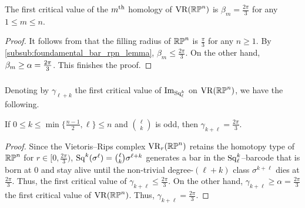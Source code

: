 \medskip\proposition
The first critical value of the $m^{\mathrm{th}}$ homology of $\operatorname{VR}(\mathbb{RP}^n)$ is $\beta_m=\frac{2\pi}{3}$ for any $1\leq m\leq n$.

\begin{proof}%
	It follows from \cite{katz1983filling} that the filling radius of $\mathbb{RP}^n$ is $\frac{\pi}{3}$ for any $n \geq 1$.
	By \cref{subsub:foundamental_bar_rpn_lemma}, $\beta_m\leq \tfrac{2\pi}{3}$.
    On the other hand, $\beta_m\geq \alpha = \tfrac{2\pi}{3}$.
    This finishes the proof.
\end{proof}

\subsubsection{}\label{subsub:gamma_rpn}

Denoting by \(\gamma_{\ell+k}\) the first critical value of \(\operatorname{Im}_{\operatorname{Sq}^k_\ell}\) on \(\operatorname{VR}(\mathbb{RP}^n)\), we have the following.

\medskip\proposition
If $0 \leq k \leq \min\{\frac{n-1}{2}, \ell\} \leq n$ and $\binom{\ell}{k}$ is odd, then $\gamma_{k+\ell} = \tfrac{2\pi}{3}$.

\begin{proof}
	Since the Vietoris--Rips complex $\operatorname{VR}_r(\mathbb{RP}^n)$ retains the homotopy type of $\mathbb{RP}^n$ for $r \in [0,\tfrac{2\pi}{3})$, $\operatorname{Sq}^k(\sigma^\ell) = \binom{\ell}{k}\sigma^{\ell+k}$ generates a bar in the $\operatorname{Sq}^k_\ell$--barcode that is born at $0$ and stay alive until the non-trivial degree-$(\ell+k)$ class $\sigma^{k+\ell}$ dies at $\tfrac{2\pi}{3}$.
	Thus, the first critical value of $\gamma_{k+\ell} \leq \tfrac{2\pi}{3}$.
	On the other hand, $\gamma_{k+\ell} \geq \alpha = \tfrac{2\pi}{3}$ the first critical value of $\operatorname{VR}(\mathbb{RP}^n)$.
	Thus, $\gamma_{k+\ell} = \tfrac{2\pi}{3}$.
\end{proof}
